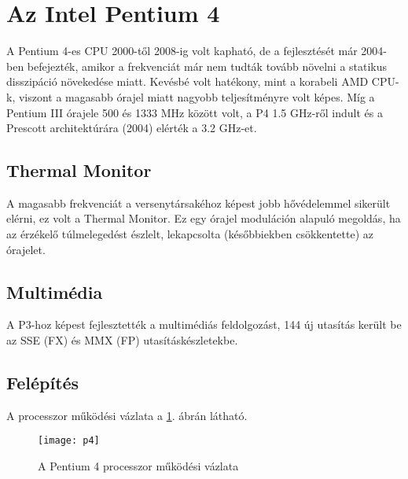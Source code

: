 \section{Az Intel Pentium 4}
A Pentium 4-es CPU 2000-től 2008-ig volt kapható, de a fejlesztését már 2004-ben befejezték, amikor a frekvenciát már nem tudták tovább növelni a statikus disszipáció növekedése miatt.
Kevésbé volt hatékony, mint a korabeli AMD CPU-k, viszont a magasabb órajel miatt nagyobb teljesítményre volt képes.
Míg a Pentium III órajele 500 és 1333 MHz között volt, a P4 1.5 GHz-ről indult és a Prescott architektúrára (2004) elérték a 3.2 GHz-et.

\subsection{Thermal Monitor}
A magasabb frekvenciát a versenytársakéhoz képest jobb hővédelemmel sikerült elérni, ez volt a Thermal Monitor.
Ez egy órajel moduláción alapuló megoldás, ha az érzékelő túlmelegedést észlelt, lekapcsolta (későbbiekben csökkentette) az órajelet.

\subsection{Multimédia}
A P3-hoz képest fejlesztették a multimédiás feldolgozást, 144 új utasítás került be az SSE (FX) és MMX (FP) utasításkészletekbe.

\subsection{Felépítés}
A processzor működési vázlata a \ref{fig:p4}. ábrán látható.
\begin{figure}[H]
    \texttt{[image: p4]}
    \centering
    \caption{A Pentium 4 processzor működési vázlata}
    \label{fig:p4}
\end{figure}